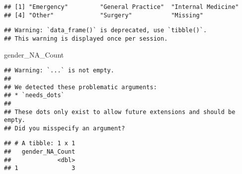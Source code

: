 \documentclass[
]{article}
\newenvironment{Shaded}{\begin{snugshade}}{\end{snugshade}}
\newcommand{\CommentTok}[1]{\textcolor[rgb]{0.56,0.35,0.01}{\textit{#1}}}
\newcommand{\DecValTok}[1]{\textcolor[rgb]{0.00,0.00,0.81}{#1}}
\newcommand{\KeywordTok}[1]{\textcolor[rgb]{0.13,0.29,0.53}{\textbf{#1}}}
\newcommand{\NormalTok}[1]{#1}
\newcommand{\OperatorTok}[1]{\textcolor[rgb]{0.81,0.36,0.00}{\textbf{#1}}}
\newcommand{\StringTok}[1]{\textcolor[rgb]{0.31,0.60,0.02}{#1}}
\begin{document}
\begin{verbatim}
## [1] "Emergency"         "General Practice"  "Internal Medicine"
## [4] "Other"             "Surgery"           "Missing"
\end{verbatim}

\begin{Shaded}
\end{Shaded}

\begin{verbatim}
## Warning: `data_frame()` is deprecated, use `tibble()`.
## This warning is displayed once per session.
\end{verbatim}

\begin{Shaded}
\begin{Highlighting}[]
\NormalTok{gender_NA_Count}
\end{Highlighting}
\end{Shaded}

\begin{verbatim}
## Warning: `...` is not empty.
## 
## We detected these problematic arguments:
## * `needs_dots`
## 
## These dots only exist to allow future extensions and should be empty.
## Did you misspecify an argument?
\end{verbatim}

\begin{verbatim}
## # A tibble: 1 x 1
##   gender_NA_Count
##             <dbl>
## 1               3
\end{verbatim}

\begin{Shaded}
\end{Shaded}
\end{document}
